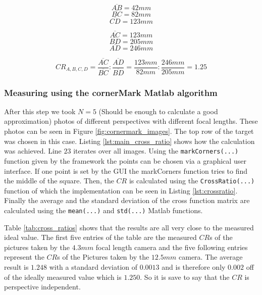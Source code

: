 \documentclass[
a4paper,     %
12pt         %
]{scrartcl}  %
\begin{document}
\begin{minipage}{0.48\textwidth}
  $$\overline{AB} = 42mm$$
  $$\overline{BC} = 82mm$$
  $$\overline{CD} = 123mm$$
\end{minipage}
\begin{minipage}{0.48\textwidth}
  $$\overline{AC} = 123mm$$
  $$\overline{BD} = 205mm$$
  $$\overline{AD} = 246mm$$
\end{minipage}

\hspace{0.5mm}

\begin{equation}
 CR_{A,B,C,D} = \frac{\overline{AC}}{\overline{BC}} : \frac{\overline{AD}}{\overline{BD}} = \frac{123mm}{82mm} : \frac{246mm}{205mm} = 1.25
 \label{eq:measure_by_hand}
\end{equation}

\subsubsection{Measuring using the cornerMark Matlab algorithm}

After this step we took $N = 5$ (Should be enough to calculate a good approximation) photos of different perspectives with different focal lengths.
These photos can be seen in Figure \ref{fig:cornermark_images}.
The top row of the target was chosen in this case.
Listing \ref{lst:main_cross_ratio} shows how the calculation was achieved.
Line $23$ iterates over all images.
Using the \lstinline{markCorners(...)} function given by the framework the points can be chosen via a graphical user interface.
If one point is set by the GUI the markCorners function tries to find the middle of the square.
Then, the $CR$ is calculated using the \lstinline{CrossRatio(...)} function of which the implementation can be seen in Listing \ref{lst:crossratio}.
Finally the average and the standard deviation of the cross function matrix are calculated using the \lstinline{mean(...)} and \lstinline{std(...)} Matlab functions.





Table \ref{tab:cross_ratios} shows that the results are all very close to the measured ideal value.
The first five entries of the table are the measured $CR$s of the pictures taken by the $4.3mm$ focal length camera and the five following entries represent the $CR$s of the Pictures taken by the $12.5mm$ camera.
The average result is $1.248$ with a standard deviation of $0.0013$ and is therefore only $0.002$ off of the ideally measured value which is $1.250$.
So it is save to say that the $CR$ is perspective independent.
\end{document}
